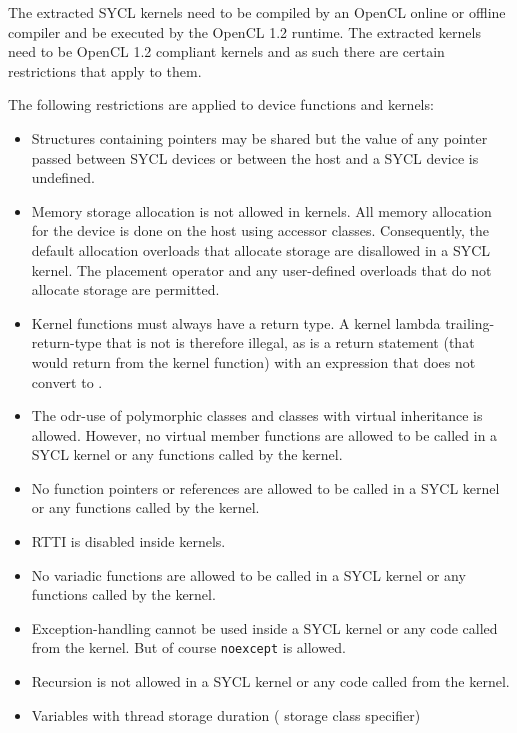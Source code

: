 The extracted SYCL kernels need to be compiled by an OpenCL online or offline
compiler and be executed by the OpenCL 1.2 runtime. The extracted kernels
need to be OpenCL 1.2 compliant kernels and as such there are certain
restrictions that apply to them.

The following restrictions are applied to device functions and kernels:

\begin{itemize}
  \item
    Structures containing pointers may be shared but the value of any pointer
    passed between SYCL devices or between the host and a SYCL device is
    undefined.
  \item
    Memory storage allocation is not allowed in kernels. All memory allocation
    for the device is done on the host using accessor classes.
    Consequently, the default allocation  overloads that
    allocate storage are disallowed in a SYCL kernel. The placement
     operator and any user-defined overloads that do not
    allocate storage are permitted.
  \item
    Kernel functions must always have a  return type.  A kernel lambda
    trailing-return-type that is not  is therefore illegal, as is a return statement
    (that would return from the kernel function) with an expression that does not convert
    to .
  \item
    The odr-use of polymorphic classes and classes with virtual inheritance is allowed.
    However, no virtual member functions are allowed to be called in a SYCL kernel or any functions called by the kernel.
  \item
    No function pointers or references are allowed to be called in a SYCL kernel
    or any functions called by the kernel.
  \item
    RTTI is disabled inside kernels.
  \item
    No variadic functions are allowed to be called in
    a SYCL kernel or any functions called by the kernel.
  \item
    Exception-handling cannot be used inside a SYCL kernel or any
    code called from the kernel. But of course \lstinline{noexcept} is
    allowed.
  \item
    Recursion is not allowed in a SYCL kernel or any
    code called from the kernel.
  \item
    Variables with thread storage duration ( storage class specifier)

\end{itemize}
